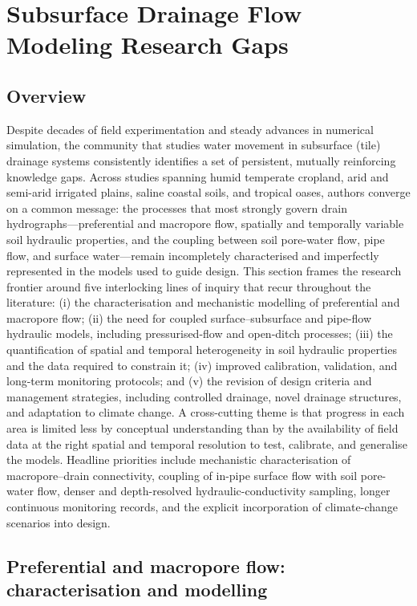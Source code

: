 \documentclass[11pt]{article}
\begin{document}
\section*{Subsurface Drainage Flow Modeling Research Gaps}

\subsection{Overview}

Despite decades of field experimentation and steady advances in numerical
simulation, the community that studies water movement in subsurface (tile)
drainage systems consistently identifies a set of persistent, mutually
reinforcing knowledge gaps. Across studies spanning humid temperate cropland,
arid and semi-arid irrigated plains, saline coastal soils, and tropical
oases, authors converge on a common message: the processes that most strongly
govern drain hydrographs---preferential and macropore flow, spatially and
temporally variable soil hydraulic properties, and the coupling between soil
pore-water flow, pipe flow, and surface water---remain incompletely
characterised and imperfectly represented in the models used to guide design.
This section frames the research frontier around five interlocking lines of
inquiry that recur throughout the literature: (i) the characterisation and
mechanistic modelling of preferential and macropore flow; (ii) the need for
coupled surface--subsurface and pipe-flow hydraulic models, including
pressurised-flow and open-ditch processes; (iii) the quantification of
spatial and temporal heterogeneity in soil hydraulic properties and the data
required to constrain it; (iv) improved calibration, validation, and
long-term monitoring protocols; and (v) the revision of design criteria and
management strategies, including controlled drainage, novel drainage
structures, and adaptation to climate change. A cross-cutting theme is that
progress in each area is limited less by conceptual understanding than by the
availability of field data at the right spatial and temporal resolution to
test, calibrate, and generalise the models. Headline priorities include
mechanistic characterisation of macropore--drain connectivity, coupling of
in-pipe surface flow with soil pore-water flow, denser and depth-resolved
hydraulic-conductivity sampling, longer continuous monitoring records, and the
explicit incorporation of climate-change scenarios into design.

\subsection{Preferential and macropore flow: characterisation and modelling}
\end{document}
